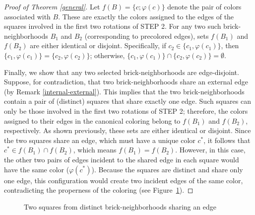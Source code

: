 \documentclass[a4paper,12pt]{article}
\begin{document}
\begin{proof}[Proof of Theorem \ref{general}]
    Let $f(B)=\{c;\varphi(c)\}$ denote the pair of colors associated with $B$. These are exactly the colors assigned to the edges of the squares involved in the first two rotations of STEP 2. For any two such brick-neighborhoods $B_1$ and $B_2$ (corresponding to precolored edges), sets $f(B_1)$ and $f(B_2)$ are either identical or disjoint. Specifically, if $c_2 \in \{c_1,\varphi(c_1)\}$, then $\{c_1,\varphi(c_1)\}=\{c_2,\varphi(c_2)\}$; otherwise, $\{c_1,\varphi(c_1)\} \cap \{c_2,\varphi(c_2)\} = \emptyset$.

    Finally, we show that any two selected brick-neighborhoods are edge-disjoint. Suppose, for contradiction, that two brick-neighborhoods share an external edge (by Remark \ref{internal-external}). This implies that the two brick-neighborhoods contain a pair of (distinct) squares that share exactly one edge. Such squares can only be those involved in the first two rotations of STEP 2; therefore, the colors assigned to their edges in the canonical coloring belong to $f(B_1)$ and $f(B_2)$, respectively. As shown previously, these sets are either identical or disjoint. Since the two squares share an edge, which must have a unique color $c^*$, it follows that $c^* \in f(B_1) \cap f(B_2)$, which means $f(B_1) = f(B_2)$. However, in this case, the other two pairs of edges incident to the shared edge in each square would have the same color ($\varphi(c^*)$). Because the squares are distinct and share only one edge, this configuration would create two incident edges of the same color, contradicting the properness of the coloring (see Figure~\ref{contradiction}).
\end{proof}

\begin{figure}[ht]
\centering
{}
\caption{Two squares from distinct brick-neighborhoods sharing an edge}
\label{contradiction}
\end{figure}
\end{document}
